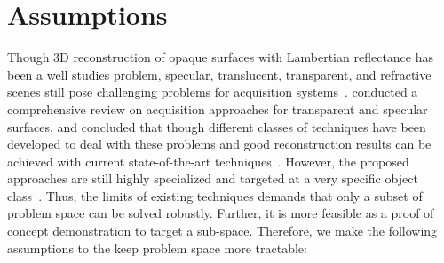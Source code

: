 
\section{Assumptions}
\label{sec:assumptions}
Though 3D reconstruction of opaque surfaces with Lambertian reflectance has been a well studies problem, specular, translucent, transparent, and refractive scenes still pose challenging problems for acquisition systems~\cite{ihrke2010transparent}. \citeauthor{ihrke2010transparent} conducted a comprehensive review on acquisition approaches for transparent and specular surfaces, and concluded that though different classes of techniques have been developed to deal with these problems and good reconstruction results can be achieved with current state-of-the-art techniques~\cite{ihrke2010transparent}. However, the proposed approaches are still highly specialized and targeted at a very specific object class~\cite{ihrke2010transparent}. Thus, the limits of existing techniques demands that only a subset of problem space can be solved robustly. Further, it is more feasible as a proof of concept demonstration to target a sub-space. Therefore, we make the following assumptions to the keep problem space more tractable:


